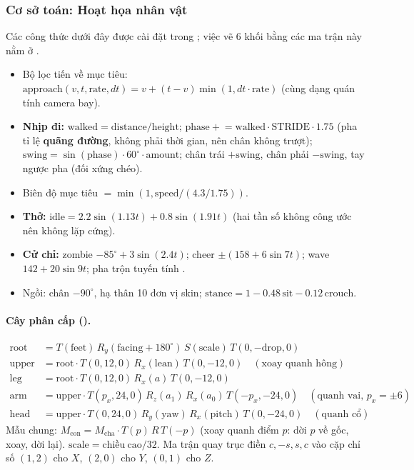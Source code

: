 \subsubsection{Cơ sở toán: Hoạt họa nhân vật}\label{s:anim}
Các công thức dưới đây được cài đặt trong ; việc vẽ 6 khối bằng các ma trận này nằm ở .
\begin{itemize}
\item Bộ lọc tiến về mục tiêu: $\mathrm{approach}(v,t,\mathrm{rate},dt)=v+(t-v)\min(1,dt\cdot\mathrm{rate})$ (cùng dạng quán tính camera bay).
\item \textbf{Nhịp đi:} $\mathrm{walked}=\mathrm{distance}/\mathrm{height}$; $\mathrm{phase}\mathrel{+}=\mathrm{walked}\cdot\mathrm{STRIDE}\cdot1.75$ (pha tỉ lệ \textbf{quãng đường}, không phải thời gian, nên chân không trượt); $\mathrm{swing}=\sin(\mathrm{phase})\cdot60^\circ\cdot\mathrm{amount}$; chân trái $+\mathrm{swing}$, chân phải $-\mathrm{swing}$, tay ngược pha (đối xứng chéo).
\item Biên độ mục tiêu $=\min(1,\mathrm{speed}/(4.3/1.75))$.
\item \textbf{Thở:} $\mathrm{idle}=2.2\sin(1.13t)+0.8\sin(1.91t)$ (hai tần số không công ước nên không lặp cứng).
\item \textbf{Cử chỉ:} zombie $-85^\circ+3\sin(2.4t)$; cheer $\pm(158+6\sin7t)$; wave $142+20\sin9t$; pha trộn tuyến tính .
\item Ngồi: chân $-90^\circ$, hạ thân 10 đơn vị skin; $\mathrm{stance}=1-0.48\,\mathrm{sit}-0.12\,\mathrm{crouch}$.
\end{itemize}

\paragraph{Cây phân cấp ().}
\begin{align*}
\mathrm{root}&=T(\mathrm{feet})\,R_y(\mathrm{facing}+180^\circ)\,S(\mathrm{scale})\,T(0,-\mathrm{drop},0)\\
\mathrm{upper}&=\mathrm{root}\cdot T(0,12,0)\,R_x(\mathrm{lean})\,T(0,-12,0)\quad(\text{xoay quanh hông})\\
\mathrm{leg}&=\mathrm{root}\cdot T(0,12,0)\,R_x(a)\,T(0,-12,0)\\
\mathrm{arm}&=\mathrm{upper}\cdot T(p_x,24,0)\,R_z(a_1)\,R_x(a_0)\,T(-p_x,-24,0)\quad(\text{quanh vai, }p_x=\pm6)\\
\mathrm{head}&=\mathrm{upper}\cdot T(0,24,0)\,R_y(\mathrm{yaw})\,R_x(\mathrm{pitch})\,T(0,-24,0)\quad(\text{quanh cổ})
\end{align*}
Mẫu chung: $M_{\mathrm{con}}=M_{\mathrm{cha}}\cdot T(p)\,R\,T(-p)$ (xoay quanh điểm $p$: dời $p$ về gốc, xoay, dời lại). $\mathrm{scale}=\mathrm{chiều\ cao}/32$. Ma trận quay trục  điền $c,-s,s,c$ vào cặp chỉ số $(1,2)$ cho $X$, $(2,0)$ cho $Y$, $(0,1)$ cho $Z$.
